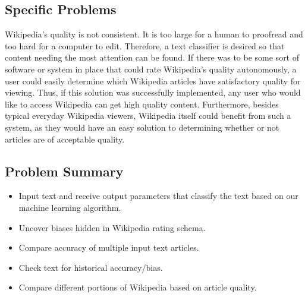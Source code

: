 \documentclass[10pt]{article}
\begin{document}
\subsection{Specific Problems}
\hspace*{28pt}Wikipedia's quality is not consistent. It is too large for a human to proofread and too hard for a computer to edit. Therefore, a text classifier is desired so that content needing the most attention can be found. If there was to be some sort of software or system in place that could rate Wikipedia's quality autonomously, a user could easily determine which Wikipedia articles have satisfactory quality for viewing. Thus, if this solution was successfully implemented, any user who would like to access Wikipedia can get high quality content. Furthermore, besides typical everyday Wikipedia viewers, Wikipedia itself could benefit from such a system, as they would have an easy solution to determining whether or not articles are of acceptable quality.
\subsection{Problem Summary}
\begin{itemize}
\item Input text and receive output parameters that classify the text based on our machine learning algorithm.
\item Uncover biases hidden in Wikipedia rating schema.
\item Compare accuracy of multiple input text articles.
\item Check text for historical accuracy/bias.
\item Compare different portions of Wikipedia based on article quality.
\end{itemize}
\end{document}
